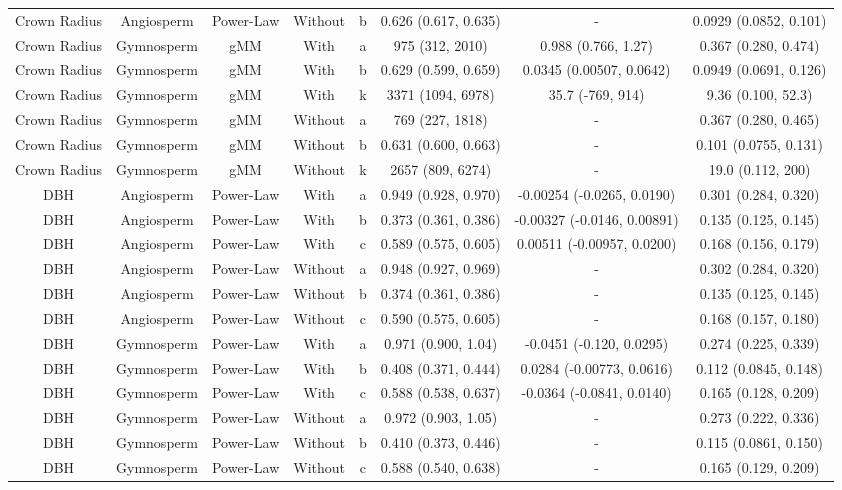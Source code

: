 \documentclass[
  12pt,
  letterpaper,
  DIV=11,
  numbers=noendperiod]{scrartcl}
\begin{document}
\begin{longtable*}[t]{cccccccc}
Crown Radius & Angiosperm & Power-Law & Without & b & 0.626 (0.617, 0.635) & - & 0.0929 (0.0852, 0.101)\\
Crown Radius & Gymnosperm & gMM & With & a & 975 (312, 2010) & 0.988 (0.766, 1.27) & 0.367 (0.280, 0.474)\\
Crown Radius & Gymnosperm & gMM & With & b & 0.629 (0.599, 0.659) & 0.0345 (0.00507, 0.0642) & 0.0949 (0.0691, 0.126)\\
Crown Radius & Gymnosperm & gMM & With & k & 3371 (1094, 6978) & 35.7 (-769, 914) & 9.36 (0.100, 52.3)\\
Crown Radius & Gymnosperm & gMM & Without & a & 769 (227, 1818) & - & 0.367 (0.280, 0.465)\\
\addlinespace
Crown Radius & Gymnosperm & gMM & Without & b & 0.631 (0.600, 0.663) & - & 0.101 (0.0755, 0.131)\\
Crown Radius & Gymnosperm & gMM & Without & k & 2657 (809, 6274) & - & 19.0 (0.112, 200)\\
DBH & Angiosperm & Power-Law & With & a & 0.949 (0.928, 0.970) & -0.00254 (-0.0265, 0.0190) & 0.301 (0.284, 0.320)\\
DBH & Angiosperm & Power-Law & With & b & 0.373 (0.361, 0.386) & -0.00327 (-0.0146, 0.00891) & 0.135 (0.125, 0.145)\\
DBH & Angiosperm & Power-Law & With & c & 0.589 (0.575, 0.605) & 0.00511 (-0.00957, 0.0200) & 0.168 (0.156, 0.179)\\
\addlinespace
DBH & Angiosperm & Power-Law & Without & a & 0.948 (0.927, 0.969) & - & 0.302 (0.284, 0.320)\\
DBH & Angiosperm & Power-Law & Without & b & 0.374 (0.361, 0.386) & - & 0.135 (0.125, 0.145)\\
DBH & Angiosperm & Power-Law & Without & c & 0.590 (0.575, 0.605) & - & 0.168 (0.157, 0.180)\\
DBH & Gymnosperm & Power-Law & With & a & 0.971 (0.900, 1.04) & -0.0451 (-0.120, 0.0295) & 0.274 (0.225, 0.339)\\
DBH & Gymnosperm & Power-Law & With & b & 0.408 (0.371, 0.444) & 0.0284 (-0.00773, 0.0616) & 0.112 (0.0845, 0.148)\\
\addlinespace
DBH & Gymnosperm & Power-Law & With & c & 0.588 (0.538, 0.637) & -0.0364 (-0.0841, 0.0140) & 0.165 (0.128, 0.209)\\
DBH & Gymnosperm & Power-Law & Without & a & 0.972 (0.903, 1.05) & - & 0.273 (0.222, 0.336)\\
DBH & Gymnosperm & Power-Law & Without & b & 0.410 (0.373, 0.446) & - & 0.115 (0.0861, 0.150)\\
DBH & Gymnosperm & Power-Law & Without & c & 0.588 (0.540, 0.638) & - & 0.165 (0.129, 0.209)\\
\bottomrule
\end{longtable*}
\endgroup{}
\end{document}
